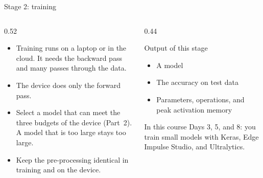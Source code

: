 \begin{frame}{Stage 2: training}
  \begin{columns}[T]
    \begin{column}{0.52\textwidth}
      \begin{itemize}
        \item Training runs on a laptop or in the cloud. It needs the
              backward pass and many passes through the data.
        \item The device does only the forward pass.
        \item Select a model that can meet the three budgets of the device
              (Part~2). A model that is too large stays too large.
        \item Keep the pre-processing identical in training and on the
              device.
      \end{itemize}
    \end{column}
    \begin{column}{0.44\textwidth}
      \begin{block}{Output of this stage}
        \begin{itemize}
          \item A  model
          \item The accuracy on test data
          \item Parameters, operations, and peak activation memory
        \end{itemize}
      \end{block}
      \begin{block}{In this course}
        Days 3, 5, and 8: you train small models with Keras, Edge Impulse
        Studio, and Ultralytics.
      \end{block}
    \end{column}
  \end{columns}
\end{frame}

